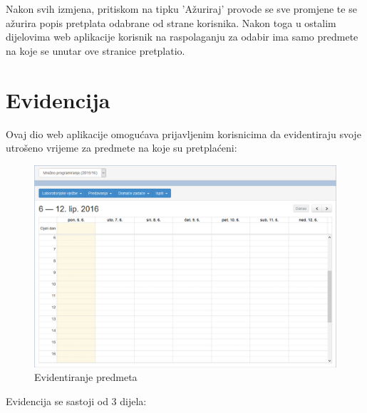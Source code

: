 \documentclass[times, utf8, zavrsni]{fer}
\begin{document}
Nakon svih izmjena, pritiskom na tipku 'Ažuriraj' provode se sve promjene te se ažurira popis pretplata odabrane od strane korisnika. Nakon toga u ostalim dijelovima web aplikacije korisnik na raspolaganju za odabir ima samo predmete na koje se unutar ove stranice pretplatio.

\section{Evidencija}
Ovaj dio web aplikacije omogućava prijavljenim korisnicima da evidentiraju svoje utrošeno vrijeme za predmete na koje su pretplaćeni:\\

\begin{figure}[H]
\centering
\includegraphics[width=\textwidth,height=\textheight,keepaspectratio]{img/evidencija-web.png}
\caption{Evidentiranje predmeta}
\label{fig:evidencija-web}
\end{figure}

Evidencija se sastoji od 3 dijela:
\end{document}
